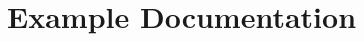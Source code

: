 \documentclass[twoside]{book}
\newcommand{\+}{\discretionary{\mbox{\scriptsize$\hookleftarrow$}}{}{}}
\newcommand{\clearemptydoublepage}{%
    \newpage{\pagestyle{empty}\cleardoublepage}%
  }
\begin{document}
\chapter{Example Documentation}


  \backmatter
  \newpage
  \clearemptydoublepage
  \printindex
\end{document}
